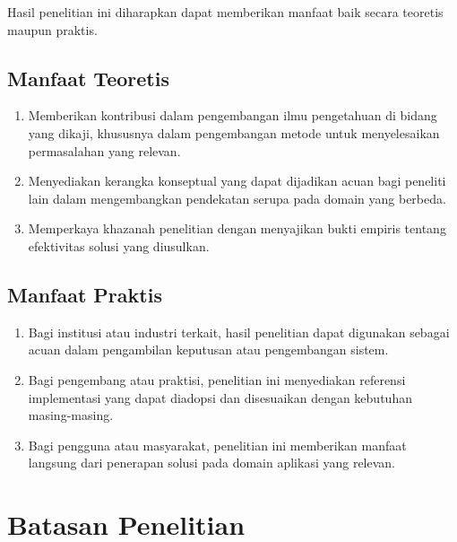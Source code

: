 Hasil penelitian ini diharapkan dapat memberikan manfaat baik secara teoretis maupun praktis.

\subsection*{Manfaat Teoretis}
\begin{enumerate}
  \item Memberikan kontribusi dalam pengembangan ilmu pengetahuan di bidang yang dikaji, khususnya dalam pengembangan metode untuk menyelesaikan permasalahan yang relevan.
  \item Menyediakan kerangka konseptual yang dapat dijadikan acuan bagi peneliti lain dalam mengembangkan pendekatan serupa pada domain yang berbeda.
  \item Memperkaya khazanah penelitian dengan menyajikan bukti empiris tentang efektivitas solusi yang diusulkan.
\end{enumerate}

\subsection*{Manfaat Praktis}
\begin{enumerate}
  \item Bagi institusi atau industri terkait, hasil penelitian dapat digunakan sebagai acuan dalam pengambilan keputusan atau pengembangan sistem.
  \item Bagi pengembang atau praktisi, penelitian ini menyediakan referensi implementasi yang dapat diadopsi dan disesuaikan dengan kebutuhan masing-masing.
  \item Bagi pengguna atau masyarakat, penelitian ini memberikan manfaat langsung dari penerapan solusi pada domain aplikasi yang relevan.
\end{enumerate}

\section{Batasan Penelitian}

